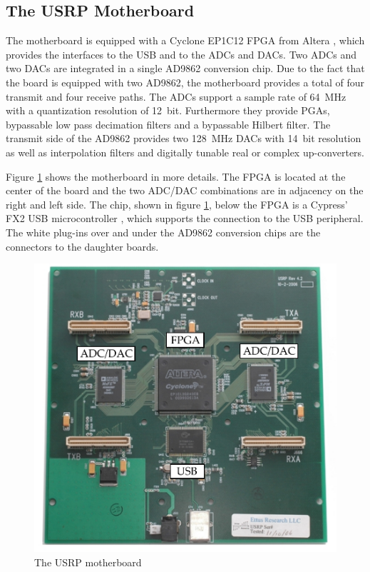 \subsection{The USRP Motherboard}
The motherboard is equipped with a Cyclone EP1C12 FPGA from Altera \cite{altera_cyclone}, which provides the interfaces to the \ac{USB} and to the \acp{ADC} and \acp{DAC}. Two \acp{ADC} and two \acp{DAC} are integrated in a single AD9862 \cite{ad9862} conversion chip. Due to the fact that the board is equipped with two AD9862, the motherboard provides a total of four transmit and four receive paths. The \acp{ADC} support a sample rate of \SI{64}{MHz} with a quantization resolution of \SI{12}{bit}. Furthermore they provide \acp{PGA}, bypassable low pass decimation filters and a bypassable Hilbert filter. The transmit side of the AD9862 provides two \SI{128}{MHz} \acp{DAC} with \SI{14}{bit} resolution as well as interpolation filters and digitally tunable real or complex up-converters.

Figure \ref{fig:USRP_motherboard} shows the motherboard in more details. The \ac{FPGA} is located at the center of the board and the two ADC/DAC combinations are in adjacency on the right and left side. The chip, shown in figure \ref{fig:USRP_motherboard}, below the FPGA is a Cypress' FX2 \ac{USB} microcontroller \cite{cypress_fx2}, which supports the connection to the \ac{USB} peripheral. The white plug-ins over and under the AD9862 conversion chips are the connectors to the daughter boards.

\begin{figure}
	\centering
	\includegraphics[width=1.0\textwidth]{../kapitel03/figures/USRP_MB_small.pdf}
	\caption{The USRP motherboard \cite{ettus:website}}
	\label{fig:USRP_motherboard}
\end{figure}

